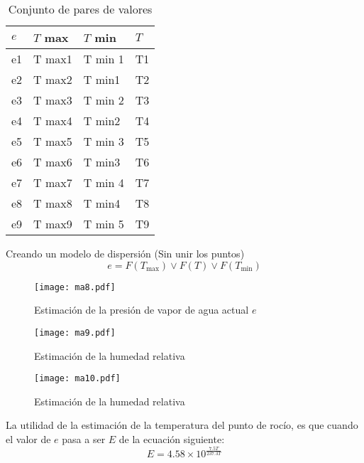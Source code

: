 \begin{table}[h!]
    \centering
    \begin{tabular}{@{}llll@{}}
    \toprule
    $e$ & $T$ max & $T$ min & $T$ \\ \midrule
    e1  & T max1  & T min 1 & T1  \\
    e2  & T max2  & T min1  & T2  \\
    e3  & T max3  & T min 2 & T3  \\
    e4  & T max4  & T min2  & T4  \\
    e5  & T max5  & T min 3 & T5  \\
    e6  & T max6  & T min3  & T6  \\
    e7  & T max7  & T min 4 & T7  \\
    e8  & T max8  & T min4  & T8  \\
    e9  & T max9  & T min 5 & T9  \\ \bottomrule
    \end{tabular}
    \caption{Conjunto de pares de valores}
    \label{tabma8}
\end{table}
Creando un modelo de dispersión (Sin unir los puntos)
\begin{equation}
    e =F\left(T_{\max }\right)\lor F(T)\lor F\left(T_{\min }\right)
\end{equation}
\begin{figure}[h!]
\centering
  \texttt{[image: ma8.pdf]}
  \caption{Estimación de la presión de vapor de agua actual $e$}
  \label{ma8}
\end{figure}
\begin{figure}[h!]
\centering
  \texttt{[image: ma9.pdf]}
  \caption{Estimación de la humedad relativa}
  \label{ma9}
\end{figure}
\begin{figure}[h!]
\centering
  \texttt{[image: ma10.pdf]}
  \caption{Estimación de la humedad relativa}
  \label{ma10}
\end{figure}
La utilidad de la estimación de la temperatura del punto de rocío, es que cuando el valor de $e$ pasa a ser $E$ de la ecuación siguiente:
\begin{equation}
    E = 4.58 \times 10^{\frac{7.5T}{237.3T}}
\end{equation}
